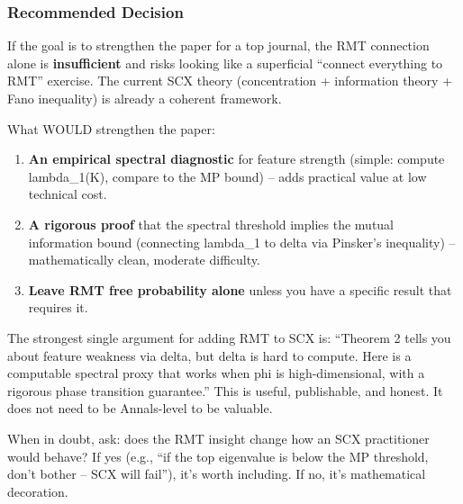 \documentclass[
  12pt,
]{article}
\providecommand{\tightlist}{%
  \setlength{\itemsep}{0pt}\setlength{\parskip}{0pt}}
\begin{document}
\subsubsection{Recommended Decision}\label{recommended-decision}

If the goal is to strengthen the paper for a top journal, the RMT
connection alone is \textbf{insufficient} and risks looking like a
superficial ``connect everything to RMT'' exercise. The current SCX
theory (concentration + information theory + Fano inequality) is already
a coherent framework.

What WOULD strengthen the paper:

\begin{enumerate}
\def\labelenumi{\arabic{enumi}.}
\tightlist
\item
  \textbf{An empirical spectral diagnostic} for feature strength
  (simple: compute lambda\_1(K), compare to the MP bound) -- adds
  practical value at low technical cost.
\item
  \textbf{A rigorous proof} that the spectral threshold implies the
  mutual information bound (connecting lambda\_1 to delta via Pinsker's
  inequality) -- mathematically clean, moderate difficulty.
\item
  \textbf{Leave RMT free probability alone} unless you have a specific
  result that requires it.
\end{enumerate}

The strongest single argument for adding RMT to SCX is: ``Theorem 2
tells you about feature weakness via delta, but delta is hard to
compute. Here is a computable spectral proxy that works when phi is
high-dimensional, with a rigorous phase transition guarantee.'' This is
useful, publishable, and honest. It does not need to be Annals-level to
be valuable.

When in doubt, ask: does the RMT insight change how an SCX practitioner
would behave? If yes (e.g., ``if the top eigenvalue is below the MP
threshold, don't bother -- SCX will fail''), it's worth including. If
no, it's mathematical decoration.
\end{document}
